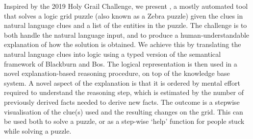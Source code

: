 Inspired by the 2019 Holy Grail Challenge, we present \ourtool, a mostly automated tool that solves a logic grid puzzle (also known as a Zebra puzzle) given the clues in natural language clues and a list of the entities in the puzzle. The challenge is to both handle the natural language input, and to produce a human-understandable explanation of how the solution is obtained.
We achieve this by translating the natural language clues into logic using a typed version of the semantical framework of Blackburn and Bos. The logical representation is then used in a novel explanation-based reasoning procedure, on top of the \idp knowledge base system. A novel aspect of the explanation is that it is ordered by mental effort required to understand the reasoning step, which is estimated by the number of previously derived facts needed to derive new facts. The outcome is a stepwise visualisation of the clue(s) used and the resulting changes on the grid.
This can be used both to solve a puzzle, or as a step-wise `help' function for people stuck while solving a puzzle.


